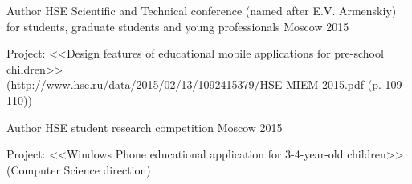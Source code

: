 \begin{cventries}

\cventry
{Author} %
{HSE Scientific and Technical conference (named after E.V. Armenskiy) for students, graduate students and young professionals} %
{Moscow} %
{2015} %
{ %
\begin{cvitems}
\item {Project: <<Design features of educational mobile applications for pre-school children>>
	\\ (http://www.hse.ru/data/2015/02/13/1092415379/HSE-MIEM-2015.pdf (p. 109-110))}
\end{cvitems}
}

\cventry
{Author} %
{HSE student research competition} %
{Moscow} %
{2015} %
{ %
\begin{cvitems}
\item {Project: <<Windows Phone educational application for 3-4-year-old children>> (Computer Science direction)}
\end{cvitems}
}

\end{cventries}
